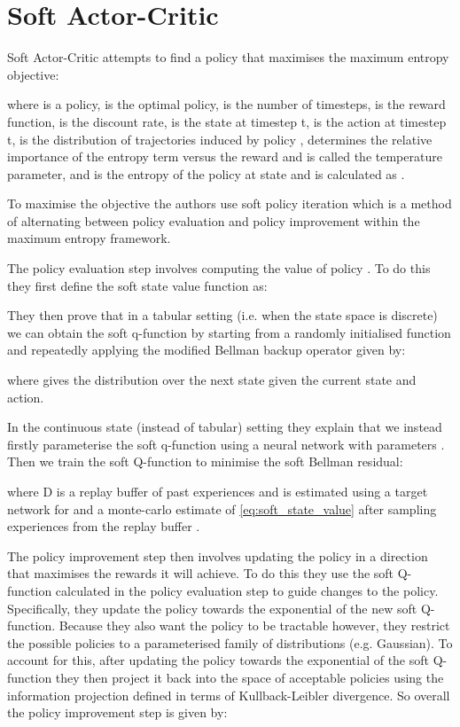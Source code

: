 \documentclass{article}
\begin{document}
\section{Soft Actor-Critic}

Soft Actor-Critic \citep{SAC} attempts to find a policy that maximises the maximum entropy objective:



where  is a policy,  is the optimal policy,  is the number of timesteps,  is the reward function,  is the discount rate,  is the state at timestep t,  is the action at timestep t,  is the distribution of trajectories induced by policy ,  determines the relative importance of the entropy term versus the reward and is called the temperature parameter, and  is the entropy of the policy  at state  and is calculated as . 

To maximise the objective the authors use soft policy iteration which is a method of alternating between policy evaluation and policy improvement within the maximum entropy framework. 

The policy evaluation step involves computing the value of policy . To do this they first define the soft state value function as:



They then prove that in a tabular setting (i.e. when the state space is discrete) we can obtain the soft q-function by starting from a randomly initialised function  and repeatedly applying the modified Bellman backup operator  given by: 



where  gives the distribution over the next state given the current state and action.

In the continuous state (instead of tabular) setting they explain that we instead firstly parameterise the soft q-function  using a neural network with parameters . Then we train the soft Q-function to minimise the soft Bellman residual:



where D is a replay buffer of past experiences and  is estimated using a target network for  and a monte-carlo estimate of \eqref{eq:soft_state_value} after sampling experiences from the replay buffer . 


The policy improvement step then involves updating the policy in a direction that maximises the rewards it will achieve. To do this they use the soft Q-function calculated in the policy evaluation step to guide changes to the policy. Specifically, they update the policy towards the exponential of the new soft Q-function. Because they also want the policy to be tractable however, they restrict the possible policies to a parameterised family of distributions (e.g. Gaussian). To account for this, after updating the policy towards the exponential of the soft Q-function they then project it back into the space of acceptable policies using the information projection defined in terms of Kullback-Leibler divergence. So overall the policy improvement step is given by:
\end{document}
